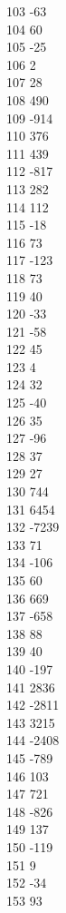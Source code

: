 { 103	-63 \\
 104	60 \\
 105	-25 \\
 106	2 \\
 107	28 \\
 108	490 \\
 109	-914 \\
 110	376 \\
 111	439 \\
 112	-817 \\
 113	282 \\
 114	112 \\
 115	-18 \\
 116	73 \\
 117	-123 \\
 118	73 \\
 119	40 \\
 120	-33 \\
 121	-58 \\
 122	45 \\
 123	4 \\
 124	32 \\
 125	-40 \\
 126	35 \\
 127	-96 \\
 128	37 \\
 129	27 \\
 130	744 \\
 131	6454 \\
 132	-7239 \\
 133	71 \\
 134	-106 \\
 135	60 \\
 136	669 \\
 137	-658 \\
 138	88 \\
 139	40 \\
 140	-197 \\
 141	2836 \\
 142	-2811 \\
 143	3215 \\
 144	-2408 \\
 145	-789 \\
 146	103 \\
 147	721 \\
 148	-826 \\
 149	137 \\
 150	-119 \\
 151	9 \\
 152	-34 \\
 153	93 \\
}
